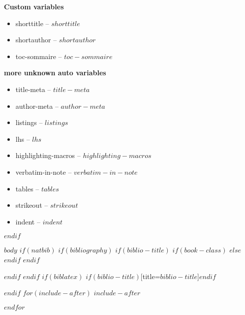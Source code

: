 \documentclass[$if(fontsize)$$fontsize$,$endif$$if(lang)$$babel-lang$,$endif$$if(papersize)$$papersize$paper,$endif$$for(classoption)$$classoption$$sep$,$endfor$]{$documentclass$}
\begin{document}
\textbf{Custom variables}

\begin{itemize}
        \item shorttitle -- $shorttitle$
        \item shortauthor -- $shortauthor$
        \item toc-sommaire -- $toc-sommaire$
\end{itemize}


\textbf{more unknown auto variables}

\begin{itemize}
        \item title-meta -- $title-meta$
        \item author-meta -- $author-meta$
        \item listings -- $listings$
        \item lhs -- $lhs$
        \item highlighting-macros -- $highlighting-macros$
        \item verbatim-in-note -- $verbatim-in-note$
        \item tables -- $tables$
        \item strikeout -- $strikeout$
        \item indent -- $indent$
\end{itemize}


$endif$




$body$
$if(natbib)$
$if(bibliography)$
$if(biblio-title)$
$if(book-class)$
\renewcommand\bibname{$biblio-title$}
$else$
\renewcommand\refname{$biblio-title$}
$endif$
$endif$


$endif$
$endif$
$if(biblatex)$
\printbibliography$if(biblio-title)$[title=$biblio-title$]$endif$

$endif$
$for(include-after)$
$include-after$

$endfor$
\end{document}
